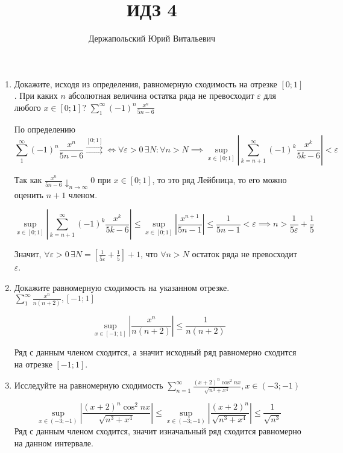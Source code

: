\documentclass{article}
\title{ИДЗ 4}
\author{Держапольский Юрий Витальевич}
\date{}
\begin{document}
\begin{large}
\maketitle

\begin{enumerate}

\item Докажите, исходя из определения, равномерную сходимость на отрезке 
$[0;1]$. При каких $n$ абсолютная величина остатка ряда не превосходит 
$\varepsilon$ для любого $x \in [0;1]$?
$ \sum\limits_{1}^{\infty}(-1)^n \frac{x^n}{5n-6}$

По определению
$$ \sum\limits_{1}^{\infty}(-1)^n \frac{x^n}{5n-6} \stackrel{[0;1]}{\rightrightarrows} \Leftrightarrow 
\forall \varepsilon > 0 \, \exists N: \forall n > N \implies \sup_{x\in[0;1]} \left|\sum_{k=n+1}^{\infty}(-1)^k \frac{x^k}{5k-6} \right| < \varepsilon $$

Так как $ \frac{x^n}{5n-6} \downarrow_{n\to\infty}0 $ при $ x \in [0;1] $, то это ряд Лейбница, то его можно оценить $n+1$ членом. 

$$ \sup_{x\in[0;1]} \left|\sum_{k=n+1}^{\infty}(-1)^k \frac{x^k}{5k-6} \right| \leq \sup_{x\in[0;1]} \left|\frac{x^{n+1}}{5n-1} \right| \leq \frac{1}{5n-1} < \varepsilon \implies n > \frac{1}{5\varepsilon} + \frac{1}{5} $$

Значит, $ \forall \varepsilon > 0 \, \exists N = \left[ \frac{1}{5\varepsilon} + \frac{1}{5} \right] + 1$, что $\forall n > N$ остаток ряда не превосходит $\varepsilon$.

\item Докажите равномерную сходимость на указанном отрезке. $ \sum\limits_{1}^{\infty} \frac{x^n}{n(n+2)}, [-1;1] $

$$ \sup_{x\in[-1;1]} \left| \frac{x^n}{n(n+2)} \right| \leq \frac{1}{n(n+2)} $$

Ряд с данным членом сходится, а значит исходный ряд равномерно сходится на отрезке $[-1;1]$.

\item Исследуйте на равномерную сходимость $ \sum\limits_{n=1}^{\infty} \frac{(x+2)^n \cos^2nx}{\sqrt{n^3 + x^4}}, x \in (-3;-1) $

$$ \sup_{x\in(-3;-1)} \left| \frac{(x+2)^n \cos^2nx}{\sqrt{n^3 + x^4}} \right| \leq \sup_{x\in(-3;-1)} \left| \frac{(x+2)^n}{\sqrt{n^3 + x^4}} \right| \leq \frac{1}{\sqrt{n^3}} $$
Ряд с данным членом сходится, значит изначальный ряд сходится равномерно на данном интервале.


\end{enumerate}
\end{large}
\end{document}
